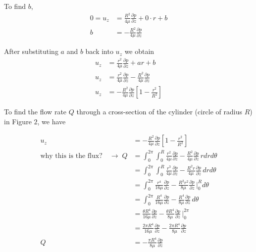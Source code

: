\documentclass[12pt, a4paper]{article}
\theoremstyle{plain}
\theoremstyle{definition}
\theoremstyle{remark}
\begin{document}
To find $b$, 
\begin{align}
0 = u_z  &= \frac{R^2}{4\mu} \frac{\partial p}{\partial z} + 0 \cdot r + b  \\
b &=  - \frac{R^2}{4\mu} \frac{\partial p}{\partial z}
\end{align}

After substituting $a$ and $b$ back into $u_z$ we obtain
\begin{align}
u_z  &= \frac{r^2}{4\mu} \frac{\partial p}{\partial z} + ar + b  \\
u_z  &= \frac{r^2}{4\mu} \frac{\partial p}{\partial z} - \frac{R^2}{4\mu} \frac{\partial p}{\partial z}  \\
u_z  &= - \frac{R^2}{4\mu} \frac{\partial p}{\partial z} \left[    1-\frac{r^2}{R^2}      \right]
\end{align}

To find the flow rate $Q$ through a cross-section of the cylinder (circle of radius $R$) in Figure $2$, we have 

\begin{align}
u_z  &= - \frac{R^2}{4\mu} \frac{\partial p}{\partial z} \left[    1-\frac{r^2}{R^2}      \right] \\
\text{why this is the flux?} \quad \rightarrow \; Q &= \int_0^{2\pi}\int_0^R \frac{r^2}{4\mu} \frac{\partial p}{\partial z} - \frac{R^2}{4\mu} \frac{\partial p}{\partial z} \, rdrd\theta \\
 &= \int_0^{2\pi}\int_0^R \frac{r^3}{4\mu} \frac{\partial p}{\partial z} - \frac{R^2r}{4\mu} \frac{\partial p}{\partial z} \, drd\theta \\
 &= \int_0^{2\pi} \frac{r^4}{16\mu} \frac{\partial p}{\partial z} - \frac{R^2r^2}{8\mu} \frac{\partial p}{\partial z} \, \Big|_0^R d\theta \\
 &= \int_0^{2\pi} \frac{R^4}{16\mu} \frac{\partial p}{\partial z} - \frac{R^4}{8\mu} \frac{\partial p}{\partial z} \, d\theta \\
 &= \frac{\theta R^4}{16\mu} \frac{\partial p}{\partial z} - \frac{\theta R^4}{8\mu} \frac{\partial p}{\partial z} \, \Big|_0^{2\pi} \\
 &= \frac{2\pi R^4}{16\mu} \frac{\partial p}{\partial z} - \frac{2\pi R^4}{8\mu} \frac{\partial p}{\partial z} \\
Q &= - \frac{\pi R^4}{8\mu} \frac{\partial p}{\partial z} 
\end{align}
\end{document}
